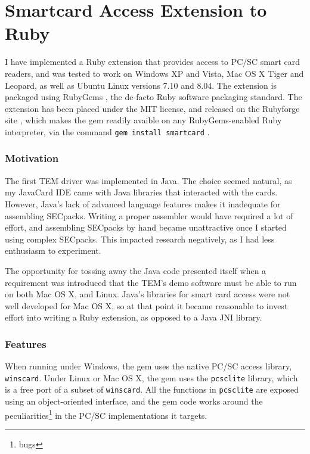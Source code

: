 \section{Smartcard Access Extension to Ruby}\label{impl:rubygem}
I have implemented a Ruby extension that provides access to PC/SC smart card
readers, and was tested to work on Windows XP and Vista, Mac OS X Tiger and
Leopard, as well as Ubuntu Linux versions 7.10 and 8.04. The extension is
packaged using RubyGems \cite{berube2007forge}, the de-facto Ruby software
packaging standard. The extension has been placed under the MIT license, and
released on the Rubyforge site \cite{berube2007forge}, which makes the gem
readily avaible on any RubyGems-enabled Ruby interpreter, via the command
\texttt{gem install smartcard} .

\subsubsection{Motivation}
The first TEM driver was implemented in Java. The choice seemed natural, as my
JavaCard IDE came with Java libraries that interacted with the cards. However,
Java's lack of advanced language features makes it inadequate for assembling
SECpacks. Writing a proper assembler would have required a lot of effort, and
assembling SECpacks by hand became unattractive once I started using complex
SECpacks. This impacted research negatively, as I had less enthusiasm to
experiment.

The opportunity for tossing away the Java code presented itself when a
requirement was introduced that the TEM's demo software must be able to run on
both Mac OS X, and Linux. Java's libraries for smart card access were not well
developed for Mac OS X, so at that point it became reasonable to invest effort
into writing a Ruby extension, as opposed to a Java JNI library.

\subsubsection{Features}
When running under Windows, the gem uses the native PC/SC access library,
\texttt{winscard}. Under Linux or Mac OS X, the gem uses the \texttt{pcsclite}
library, which is a free port of a subset of \texttt{winscard}. All the
functions in \texttt{pcsclite} are exposed using an object-oriented interface,
and the gem code works around the peculiarities\footnote{bugs} in the PC/SC
implementations it targets.
